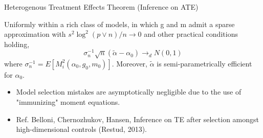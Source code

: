 \documentclass{beamer}
\begin{document}
\begin{frame}{Heterogenous Treatment Effects}
\small
Theorem (Inference on ATE)

Uniformly within a rich class of models, in which g and m admit a
sparse approximation with $s^2 \log^2(p \vee n)/n \rightarrow 0$ and other practical
conditions holding,
\[ \sigma_n^{-1} \sqrt{n} (\tilde{\alpha} - \alpha_0) \rightarrow_d N(0,1) \]
where $\sigma^{-1}_n = E[M^2_i (\alpha_0, g_0, m_0)].$
Moreover, $\tilde{\alpha}$ is semi-parametrically efficient for $\alpha_0$.
\begin{itemize}
\item Model selection mistakes are asymptotically negligible due to the
use of "immunizing" moment equations.
\item Ref. Belloni, Chernozhukov, Hansen, Inference on TE after selection amongst
high-dimensional controls (Restud, 2013).
\end{itemize}
\end{frame}
\end{document}
